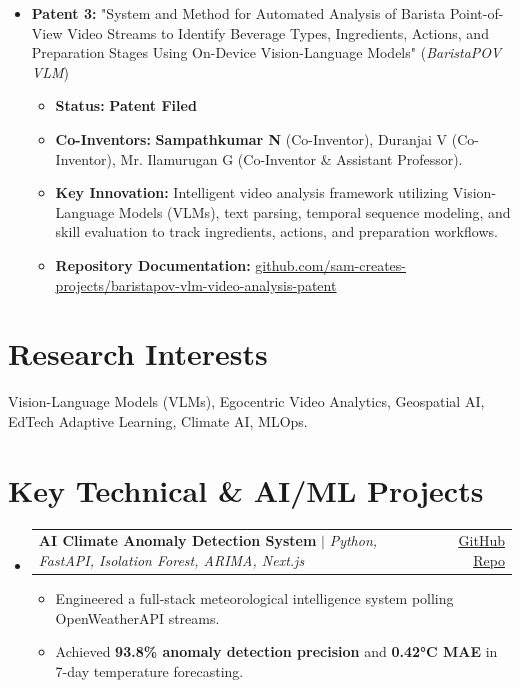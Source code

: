 \documentclass[letterpaper,11pt]{article}
\begin{document}
\begin{itemize}[leftmargin=0.15in, label={}]
    \item \textbf{Patent 3:} "System and Method for Automated Analysis of Barista Point-of-View Video Streams to Identify Beverage Types, Ingredients, Actions, and Preparation Stages Using On-Device Vision-Language Models" (\emph{BaristaPOV VLM})
      \begin{itemize}[leftmargin=0.2in]
        \item \textbf{Status:} \textbf{Patent Filed}
        \item \textbf{Co-Inventors:} \textbf{Sampathkumar N} (Co-Inventor), Duranjai V (Co-Inventor), Mr. Ilamurugan G (Co-Inventor \& Assistant Professor).
        \item \textbf{Key Innovation:} Intelligent video analysis framework utilizing Vision-Language Models (VLMs), text parsing, temporal sequence modeling, and skill evaluation to track ingredients, actions, and preparation workflows.
        \item \textbf{Repository Documentation:} \href{https://github.com/sam-creates-projects/baristapov-vlm-video-analysis-patent}{\underline{github.com/sam-creates-projects/baristapov-vlm-video-analysis-patent}}
      \end{itemize}
  \end{itemize}

\section{Research Interests}
  \begin{itemize}[leftmargin=0.15in, label={}]
    \small{\item{
      Vision-Language Models (VLMs), Egocentric Video Analytics, Geospatial AI, EdTech Adaptive Learning, Climate AI, MLOps.
    }}
  \end{itemize}

\section{Key Technical & AI/ML Projects}
  \begin{itemize}[leftmargin=0.15in, label={}]
    
    \item
      \begin{tabularx}{\linewidth}{X r}
        \textbf{AI Climate Anomaly Detection System} $|$ \emph{Python, FastAPI, Isolation Forest, ARIMA, Next.js} & \href{https://github.com/sam-creates-projects/climate-ai-system}{\underline{GitHub Repo}} \\
      \end{tabularx}
      \begin{itemize}[leftmargin=0.2in]
        \item Engineered a full-stack meteorological intelligence system polling OpenWeatherAPI streams.
        \item Achieved \textbf{93.8\% anomaly detection precision} and \textbf{0.42°C MAE} in 7-day temperature forecasting.
      \end{itemize}
  \end{itemize}
\end{document}

